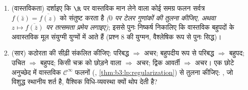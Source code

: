\begin{problem}
\begin{enumerate}[resume]
        करेंगी।
  \item (वास्तविकता) दर्शाइए कि $\R$ पर वास्तविक मान लेने वाला
        कोई समग्र फलन सर्वत्र $f(\bar z) =
        \overline{f(z)}$ को संतुष्ट करता है
        \emph{($0$ पर टेलर गुणांकों की तुलना कीजिए, अथवा $z \mapsto \overline{f(\bar z)}$
        पर तत्समता प्रमेय लगाइए)}; इससे पुनः निष्कर्ष निकालिए कि
        वास्तविक बहुपदों के अवास्तविक मूल संयुग्मी युग्मों में
        आते हैं (प्रश्न 8 की युग्मन, वैश्लेषिक रूप से पुनः
        सिद्ध)।
  \item (सार) कठोरता की सीढ़ी संकलित कीजिए: परिबद्ध $\Rightarrow$ अचर;
        बहुपदीय रूप से परिबद्ध $\Rightarrow$ बहुपद; उचित $\Rightarrow$ बहुपद; किसी
        चक्र को छोड़ने वाला $\Rightarrow$ अचर; द्विक आवर्ती $\Rightarrow$ अचर।
        एक छोटे अनुच्छेद में वास्तविक $\mathcal C^\infty$ फलनों (,
        \cref{thm:b3:lp:regularization}) से तुलना कीजिए: , जो विशुद्ध स्थानीय
        शर्त है, वैश्विक विधि-व्यवस्था क्यों थोप देती है?
\end{enumerate}


\end{problem}
